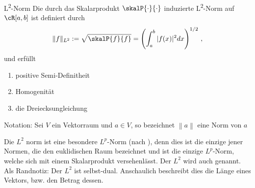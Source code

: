 \begin{definition}[deflabel=L2Norm]{L\textsuperscript{2}-Norm}
    Die durch das Skalarprodukt $\skalP{\cdot}{\cdot}$ induzierte L\textsuperscript{2}-Norm auf $\cR[a,b]$ ist definiert durch
    $$
        \|f\|_{L^2} := \sqrt{\skalP{f}{f}} = \left( \int_a^b |f(x)|^2dx \right)^{1/2} \, ,
    $$
    und erfüllt 
    \begin{enumerate}
        \item positive Semi-Definitheit
        \item Homogenität
        \item die Dreiecksungleichung
    \end{enumerate}

    \bigskip

    Notation:
    Sei $V$ ein Vektorraum und $a\in V$, so bezeichnet $\left\|a\right\|$ eine Norm von $a$
\end{definition}
Die $L^2$ norm ist eine besondere $L^p$-Norm (nach ), denn dies ist die einzige jener Normen, die den euklidischen Raum bezeichnet und ist die einzige $L^p$-Norm, welche sich mit einem Skalarprodukt versehenlässt. Der $L^2$ wird auch genannt.
Als Randnotiz: Der $L^2$ ist selbst-dual.
Anschaulich beschreibt dies die Länge eines Vektors, bzw. den Betrag dessen.

